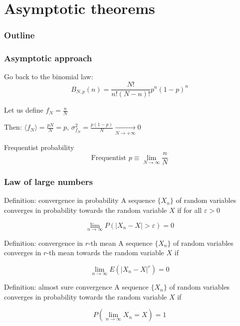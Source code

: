 \documentclass[9pt]{beamer}
\newif\ifmynote
\newcommand\mynote[1]{%
\ifmynote \textbf{#1} \else \fi
}
\begin{document}
\section{Asymptotic theorems}

\begin{frame}
 \frametitle{Outline}
 
 \tableofcontents[current]
\end{frame}

\begin{frame}
 \frametitle{Asymptotic approach}
 
 \mynote{Écrire au tableau}
 
 Go back to the binomial law: $$B_{N,p}(n) = \frac{N!}{n!(N-n)!} p^n (1-p)^n$$
 
 Let us define $f_N = \frac{n}{N}$
 
 Then: $\langle f_N \rangle = \frac{pN}{N} = p$, $\sigma^2_{f_N} = \frac{p(1-p)}{N} \xrightarrow[N \to +\infty]{} 0$
 
 \begin{block}{Frequentist probability}
  $$\text{Frequentist } p \equiv \lim_{N \to \infty} \frac{n}{N}$$
 \end{block}

\end{frame}

\begin{frame}
 \frametitle{Law of large numbers}
 
 \mynote{Écrire au tableau}
 
 \begin{block}{Definition: convergence in probability}
  A sequence $\{X_n\}$ of random variables converges in probability towards the random variable $X$ if for all $\varepsilon > 0$

    $$ \lim _{n\to \infty }P \left( |X_{n}-X|>\varepsilon \right)=0$$
 \end{block}
 
 \begin{block}{Definition: convergence in $r$-th mean}
  A sequence $\{X_n\}$ of random variables converges in $r$-th mean towards the random variable $X$ if

    $$ \lim _{n\to \infty } E(|X_n - X|^r)=0$$
 \end{block}
 
 \begin{block}{Definition: almost sure convergence}
  A sequence $\{X_n\}$ of random variables converges in probability towards the random variable $X$ if

    $$ P\left(\lim _{n\to \infty }  X_n = X \right)=1$$
 \end{block}

\end{frame}
\end{document}
